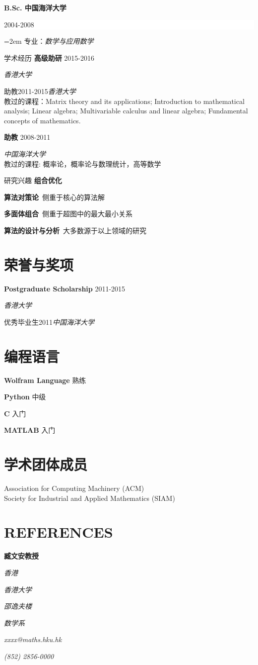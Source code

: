 \documentclass[UTF8,nofonts]{ctexart}
\renewcommand{\refname}{文章}
\newcommand{\NewPart}[1]{\section*{\uppercase{#1}}}
\newcommand{\EducationEntry}[4]{
		\noindent \textbf{#1} \hfill 					%
		\colorbox{White}{%
			\parbox{10em}{%
			\hfill\color{Black}#2}} \par				%
		\noindent\hangindent=2em\hangafter=0 #3 \par					%
		\iffalse
		\noindent\hangindent=2em\hangafter=0 #4 	%
		\normalsize \par
		\fi
		}
\newcommand{\WorkEntry}[4]{						%
		\noindent \textbf{#1} \hfill 					%
		\colorbox{White}{\color{Black}#2} \par		%
		\noindent #3 \par
		\iffalse					%
		\noindent \small #4 	%
		\normalsize \par
		\fi
		}
\newcommand{\RefEntry}[7]{						%
		\noindent \textbf{#1} \par 					%
		\noindent \textit{#2} \par	%
		\noindent \textit{#3} \par
		\noindent \textit{#4} \par%
		\noindent \textit{#5} \par
		\noindent \textit{#6} \par
		\noindent \textit{#7} \par
		}
\newcommand{\codeEntry}[2]{						%
		\noindent \textbf{#1} \hfill 					%
		\colorbox{White}{\color{Black}#2} \par		%
		}
\begin{document}
\EducationEntry{B.Sc.  中国海洋大学}{2004-2008}{专业：\textit{数学与应用数学}}

\NewPart{学术经历}{}
\WorkEntry{高级助研}{2015-2016}{\textit{香港大学}}

\WorkEntry{助教}{2011-2015}{\textit{香港大学}\\教过的课程：Matrix theory and its applications; Introduction to mathematical analysis; Linear algebra; Multivariable calculus and linear algebra; Fundamental concepts of mathematics.}


\WorkEntry{助教}{2008-2011}{\textit{中国海洋大学}
\\教过的课程: 概率论，概率论与数理统计，高等数学}

\NewPart{研究兴趣}{}
\noindent\textbf{组合优化}
\vspace{2mm}

\noindent\textbf{算法对策论}~{\small 侧重于核心的算法解}
\vspace{2mm}

\noindent\textbf{多面体组合}~{\small 侧重于超图中的最大最小关系}
\vspace{2mm}

\noindent\textbf{算法的设计与分析}~{\small 大多数源于以上领域的研究}

%

\nocite{*}


\NewPart{荣誉与奖项}{}
\WorkEntry{Postgraduate Scholarship}{2011-2015}{\textit{香港大学}}

\WorkEntry{优秀毕业生}{2011}{\textit{中国海洋大学}}

\NewPart{编程语言}
\codeEntry{Wolfram Language}{熟练}
\codeEntry{Python}{中级}
\codeEntry{C}{入门}
\codeEntry{MATLAB}{入门}

\NewPart{学术团体成员}{}
\noindent Association for Computing Machinery (ACM)\\
Society for Industrial and Applied Mathematics (SIAM)

\NewPart{References}
\RefEntry{臧文安教授}{香港}{香港大学}{邵逸夫楼}{数学系}{xxxx@maths.hku.hk}{(852) 2856-0000}

\end{document}
